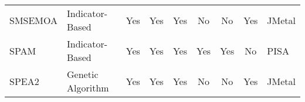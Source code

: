 \begin{sidewaystable}
\begin{tabular}{ll|cccccc|l}
  SMSEMOA & Indicator-Based & \cellcolor{green!25}Yes & \cellcolor{green!25}Yes & \cellcolor{green!25}Yes & \cellcolor{red!25}No & \cellcolor{red!25}No & \cellcolor{green!25}Yes & JMetal \\
  SPAM & Indicator-Based & \cellcolor{green!25}Yes & \cellcolor{green!25}Yes & \cellcolor{green!25}Yes & \cellcolor{green!25}Yes & \cellcolor{green!25}Yes & \cellcolor{red!25}No & PISA \\
  SPEA2 & Genetic Algorithm & \cellcolor{green!25}Yes & \cellcolor{green!25}Yes & \cellcolor{green!25}Yes & \cellcolor{red!25}No & \cellcolor{red!25}No & \cellcolor{green!25}Yes & JMetal \\
  \hline
  \end{tabular}
\end{sidewaystable}
